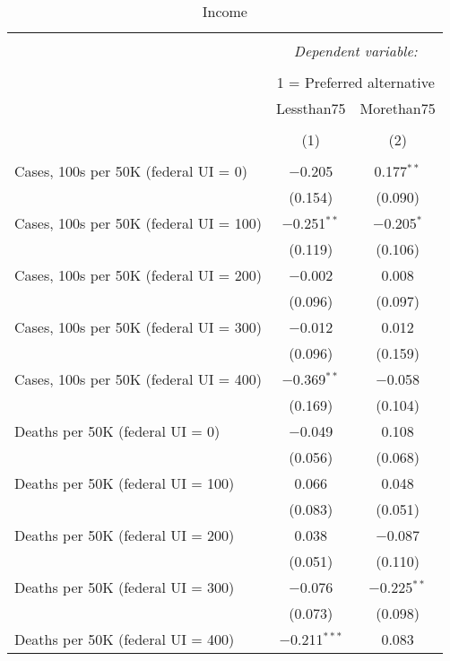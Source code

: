 
\begin{table}[!htbp] \centering \scriptsize 
  \caption{Income} 
  \label{} 
\begin{tabular}{@{\extracolsep{5pt}}lcc} 
\\[-1.8ex]\hline 
\hline \\[-1.8ex] 
 & \multicolumn{2}{c}{\textit{Dependent variable:}} \\ 
\cline{2-3} 
\\[-1.8ex] & \multicolumn{2}{c}{1 = Preferred alternative} \\ 
 & Lessthan75 & Morethan75 \\ 
\\[-1.8ex] & (1) & (2)\\ 
\hline \\[-1.8ex] 
 Cases, 100s per 50K (federal UI = 0) & $-$0.205 & 0.177$^{**}$ \\ 
  & (0.154) & (0.090) \\ 
  Cases, 100s per 50K (federal UI = 100) & $-$0.251$^{**}$ & $-$0.205$^{*}$ \\ 
  & (0.119) & (0.106) \\ 
  Cases, 100s per 50K (federal UI = 200) & $-$0.002 & 0.008 \\ 
  & (0.096) & (0.097) \\ 
  Cases, 100s per 50K (federal UI = 300) & $-$0.012 & 0.012 \\ 
  & (0.096) & (0.159) \\ 
  Cases, 100s per 50K (federal UI = 400) & $-$0.369$^{**}$ & $-$0.058 \\ 
  & (0.169) & (0.104) \\ 
  Deaths per 50K (federal UI = 0) & $-$0.049 & 0.108 \\ 
  & (0.056) & (0.068) \\ 
  Deaths per 50K (federal UI = 100) & 0.066 & 0.048 \\ 
  & (0.083) & (0.051) \\ 
  Deaths per 50K (federal UI = 200) & 0.038 & $-$0.087 \\ 
  & (0.051) & (0.110) \\ 
  Deaths per 50K (federal UI = 300) & $-$0.076 & $-$0.225$^{**}$ \\ 
  & (0.073) & (0.098) \\ 
  Deaths per 50K (federal UI = 400) & $-$0.211$^{***}$ & 0.083 \\ 

\end{tabular}
\end{table}
